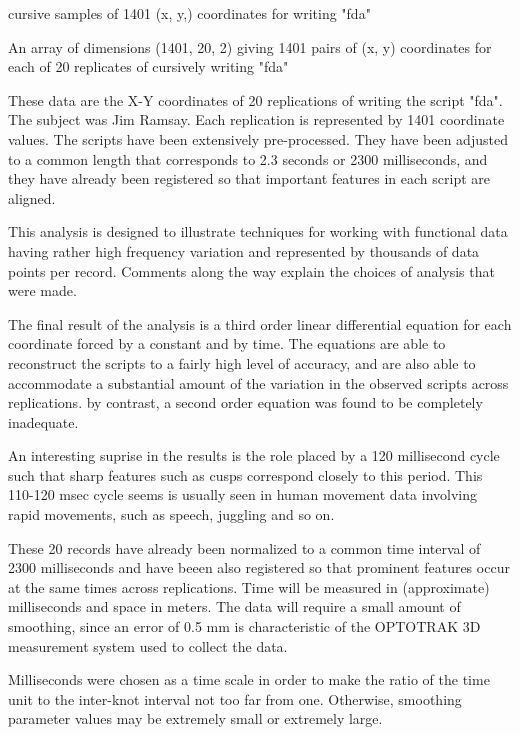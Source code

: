 \begin{Description} cursive samples of 1401 (x, y,) coordinates for writing "fda"
\end{Description}
\begin{Format}\relax
An array of dimensions (1401, 20, 2) giving 1401 pairs of (x, y)
coordinates for each of 20 replicates of cursively writing "fda"
\end{Format}
\begin{Details}\relax
These data are the X-Y coordinates of 20 replications of writing
the script "fda".  The subject was Jim Ramsay.  Each replication
is represented by 1401 coordinate values.  The scripts have been 
extensively pre-processed.  They have been adjusted to a common
length that corresponds to 2.3 seconds or 2300 milliseconds, and
they have already been registered so that important features in
each script are aligned.

This analysis is designed to illustrate techniques for working
with functional data having rather high frequency variation and
represented by thousands of data points per record.  Comments
along the way explain the choices of analysis that were made.

The final result of the analysis is a third order linear 
differential equation for each coordinate forced by a 
constant and by time.  The equations are able to reconstruct
the scripts to a fairly high level of accuracy, and are also
able to accommodate a substantial amount of the variation in
the observed scripts across replications.  by contrast, a 
second order equation was found to be completely inadequate.

An interesting suprise in the results is the role placed by
a 120 millisecond cycle such that sharp features such as cusps
correspond closely to this period.  This 110-120 msec cycle
seems is usually seen in human movement data involving rapid
movements, such as speech, juggling and so on.

These 20 records have already been normalized to a common time
interval of 2300 milliseconds and have beeen also registered so that
prominent features occur at the same times across replications.  Time
will be measured in (approximate) milliseconds and space in meters.
The data will require a small amount of smoothing, since an error of
0.5 mm is characteristic of the OPTOTRAK 3D measurement system used to
collect the data.

Milliseconds were chosen as a time scale in order to make the ratio of
the time unit to the inter-knot interval not too far from one.
Otherwise, smoothing parameter values may be extremely small or
extremely large.


\end{Details}
